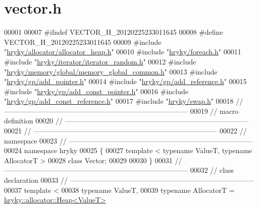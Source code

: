 \hypertarget{vector_8h_source}{\section{vector.\-h}
}

\begin{DoxyCode}
00001 
00007 \textcolor{preprocessor}{#ifndef VECTOR\_H\_20120225233011645}
00008 \textcolor{preprocessor}{}\textcolor{preprocessor}{#define VECTOR\_H\_20120225233011645}
00009 \textcolor{preprocessor}{}\textcolor{preprocessor}{#include "\hyperlink{allocator__heap_8h}{hryky/allocator/allocator_heap.h}"}
00010 \textcolor{preprocessor}{#include "\hyperlink{foreach_8h}{hryky/foreach.h}"}
00011 \textcolor{preprocessor}{#include "\hyperlink{iterator__random_8h}{hryky/iterator/iterator_random.h}"}
00012 \textcolor{preprocessor}{#include "\hyperlink{memory__global__common_8h}{hryky/memory/global/memory_global_common.h}"}
00013 \textcolor{preprocessor}{#include "\hyperlink{add__pointer_8h}{hryky/gp/add_pointer.h}"}
00014 \textcolor{preprocessor}{#include "\hyperlink{add__reference_8h}{hryky/gp/add_reference.h}"}
00015 \textcolor{preprocessor}{#include "\hyperlink{add__const__pointer_8h}{hryky/gp/add_const_pointer.h}"}
00016 \textcolor{preprocessor}{#include "\hyperlink{add__const__reference_8h}{hryky/gp/add_const_reference.h}"}
00017 \textcolor{preprocessor}{#include "\hyperlink{swap_8h}{hryky/swap.h}"}
00018 \textcolor{comment}{//
      ------------------------------------------------------------------------------}
00019 \textcolor{comment}{// macro definition}
00020 \textcolor{comment}{//
      ------------------------------------------------------------------------------}
00021 \textcolor{comment}{//
      ------------------------------------------------------------------------------}
00022 \textcolor{comment}{// namespace}
00023 \textcolor{comment}{//
      ------------------------------------------------------------------------------}
00024 \textcolor{keyword}{namespace }hryky
00025 \{
00027     \textcolor{keyword}{template} < \textcolor{keyword}{typename} ValueT, \textcolor{keyword}{typename} AllocatorT >
00028     \textcolor{keyword}{class }Vector;
00029 
00030 \}
00031 \textcolor{comment}{//
      ------------------------------------------------------------------------------}
00032 \textcolor{comment}{// class declaration}
00033 \textcolor{comment}{//
      ------------------------------------------------------------------------------}
00037 \textcolor{comment}{}\textcolor{keyword}{template} <
00038     \textcolor{keyword}{typename} ValueT,
00039     \textcolor{keyword}{typename} AllocatorT = \hyperlink{classhryky_1_1allocator_1_1_heap}{hryky::allocator::Heap<ValueT>}

\end{DoxyCode}
